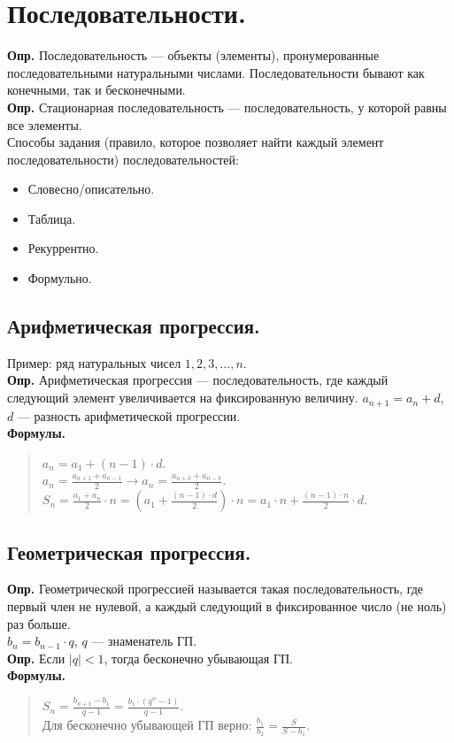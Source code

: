 \documentclass{article}
\begin{document}
	\tableofcontents
	\setcounter{tocdepth}{3}
	\newpage
	\section{Последовательности.}
	\textbf{Опр.} Последовательность --- объекты (элементы), пронумерованные последовательными натуральными числами. Последовательности бывают как конечными, так и бесконечными. \\
	\textbf{Опр.} Стационарная последовательность --- последовательность, у которой равны все элементы. \\
	Способы задания (правило, которое позволяет найти каждый элемент последовательности) последовательностей:
	\begin{itemize}
		\item Словесно/описательно.
		\item Таблица.
		\item Рекуррентно.
		\item Формульно.
	\end{itemize}
	\subsection{Арифметическая прогрессия.}
	Пример: ряд натуральных чисел $1, 2, 3, \dots, n$. \\
	\textbf{Опр.} Арифметическая прогрессия --- последовательность, где каждый следующий элемент увеличивается на фиксированную величину. $a_{n + 1} = a_n + d$, $d$ --- разность арифметической прогрессии. \\
	\textbf{Формулы.}
	\begin{quote}
		$a_n = a_1 + (n - 1) \cdot d$. \\
		$a_n = \frac{a_{n + 1} + a_{n - 1}}{2} \rightarrow a_n = \frac{a_{n + k} + a_{n - k}}{2}$. \\
		$S_n = \frac{a_1 + a_n}{2} \cdot n = (a_1 + \frac{(n - 1) \cdot d}{2}) \cdot n = a_1 \cdot n + \frac{(n - 1) \cdot n}{2} \cdot d$.
	\end{quote}
	\subsection{Геометрическая прогрессия.}
	\textbf{Опр.} Геометрической прогрессией называется такая последовательность, где первый член не нулевой, а каждый следующий в фиксированное число (не ноль) раз больше. \\
	$b_n = b_{n - 1} \cdot q$, $q$ --- знаменатель ГП. \\
	\textbf{Опр.} Если $|q| < 1$, тогда бесконечно убывающая ГП. \\
	\textbf{Формулы.}
	\begin{quote}
		$S_n = \frac{b_{n + 1} - b_1}{q - 1} = \frac{b_1 \cdot (q^n - 1)}{q - 1}$. \\
		Для бесконечно убывающей ГП верно: $\frac{b_1}{b_2} = \frac{S}{S - b_1}$.
	\end{quote}
\end{document}
